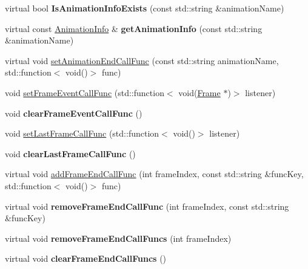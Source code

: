 \begin{DoxyCompactItemize}
virtual bool {\bfseries Is\+Animation\+Info\+Exists} (const std\+::string \&animation\+Name)
\item 
\mbox{\label{classActionTimeline_a28a8c9f1217bdc7aa8ce45ab92ee99e2}} 
virtual const \hyperlink{structAnimationInfo}{Animation\+Info} \& {\bfseries get\+Animation\+Info} (const std\+::string \&animation\+Name)
\item 
virtual void \hyperlink{classActionTimeline_a9622a091358533cd1ea7fdbe20a81005}{set\+Animation\+End\+Call\+Func} (const std\+::string animation\+Name, std\+::function$<$ void()$>$ func)
\item 
void \hyperlink{classActionTimeline_ad1ab1387db4e1f8df9af2d0e339046f2}{set\+Frame\+Event\+Call\+Func} (std\+::function$<$ void(\hyperlink{classFrame}{Frame} $\ast$)$>$ listener)
\item 
\mbox{\label{classActionTimeline_a5708d72adbe16fa5669b4c00f6aef884}} 
void {\bfseries clear\+Frame\+Event\+Call\+Func} ()
\item 
void \hyperlink{classActionTimeline_a1c80f944675b1715d4a06053ebad51fd}{set\+Last\+Frame\+Call\+Func} (std\+::function$<$ void()$>$ listener)
\item 
\mbox{\label{classActionTimeline_a92c19bb7fd076b0cb1f5f5f2434c6d9e}} 
void {\bfseries clear\+Last\+Frame\+Call\+Func} ()
\item 
virtual void \hyperlink{classActionTimeline_a34e99b162e3b86d32c6043f8d41e3d5d}{add\+Frame\+End\+Call\+Func} (int frame\+Index, const std\+::string \&func\+Key, std\+::function$<$ void()$>$ func)
\item 
\mbox{\label{classActionTimeline_a7f2f28fd0e5e9327d16afc9fcf74d24b}} 
virtual void {\bfseries remove\+Frame\+End\+Call\+Func} (int frame\+Index, const std\+::string \&func\+Key)
\item 
\mbox{\label{classActionTimeline_a97518f4c35c635acb7e5a8b0b8db84dc}} 
virtual void {\bfseries remove\+Frame\+End\+Call\+Funcs} (int frame\+Index)
\item 
\mbox{\label{classActionTimeline_a8b6d1ff9e404e5246cfda6f344c10765}} 
virtual void {\bfseries clear\+Frame\+End\+Call\+Funcs} ()
\item 

\end{DoxyCompactItemize}
